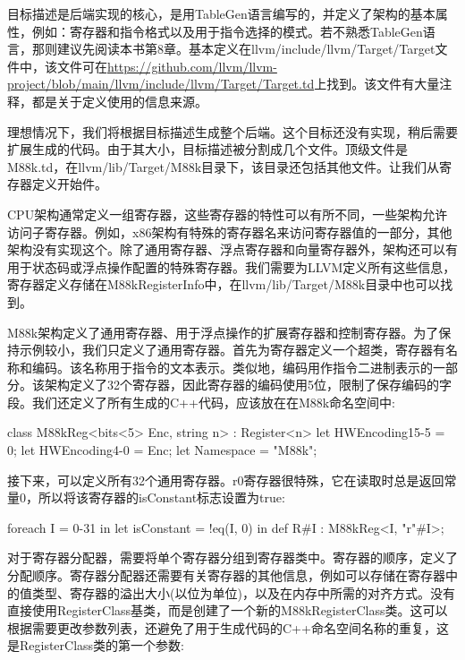 
目标描述是后端实现的核心，是用TableGen语言编写的，并定义了架构的基本属性，例如：寄存器和指令格式以及用于指令选择的模式。若不熟悉TableGen语言，那则建议先阅读本书第8章。基本定义在llvm/include/llvm/Target/Target文件中，该文件可在\url{https://github.com/llvm/llvm-project/blob/main/llvm/include/llvm/Target/Target.td}上找到。该文件有大量注释，都是关于定义使用的信息来源。

理想情况下，我们将根据目标描述生成整个后端。这个目标还没有实现，稍后需要扩展生成的代码。由于其大小，目标描述被分割成几个文件。顶级文件是M88k.td，在llvm/lib/Target/M88k目录下，该目录还包括其他文件。让我们从寄存器定义开始件。


CPU架构通常定义一组寄存器，这些寄存器的特性可以有所不同，一些架构允许访问子寄存器。例如，x86架构有特殊的寄存器名来访问寄存器值的一部分，其他架构没有实现这个。除了通用寄存器、浮点寄存器和向量寄存器外，架构还可以有用于状态码或浮点操作配置的特殊寄存器。我们需要为LLVM定义所有这些信息，寄存器定义存储在M88kRegisterInfo中，在llvm/lib/Target/M88k目录中也可以找到。

M88k架构定义了通用寄存器、用于浮点操作的扩展寄存器和控制寄存器。为了保持示例较小，我们只定义了通用寄存器。首先为寄存器定义一个超类，寄存器有名称和编码。该名称用于指令的文本表示。类似地，编码用作指令二进制表示的一部分。该架构定义了32个寄存器，因此寄存器的编码使用5位，限制了保存编码的字段。我们还定义了所有生成的C++代码，应该放在在M88k命名空间中:

\begin{cpp}
class M88kReg<bits<5> Enc, string n> : Register<n> {
    let HWEncoding{15-5} = 0;
    let HWEncoding{4-0} = Enc;
    let Namespace = "M88k";
}
\end{cpp}

接下来，可以定义所有32个通用寄存器。r0寄存器很特殊，它在读取时总是返回常量0，所以将该寄存器的isConstant标志设置为true:

\begin{cpp}
foreach I = 0-31 in {
    let isConstant = !eq(I, 0) in
        def R#I : M88kReg<I, "r"#I>;
}
\end{cpp}

对于寄存器分配器，需要将单个寄存器分组到寄存器类中。寄存器的顺序，定义了分配顺序。寄存器分配器还需要有关寄存器的其他信息，例如可以存储在寄存器中的值类型、寄存器的溢出大小(以位为单位)，以及在内存中所需的对齐方式。没有直接使用RegisterClass基类，而是创建了一个新的M88kRegisterClass类。这可以根据需要更改参数列表，还避免了用于生成代码的C++命名空间名称的重复，这是RegisterClass类的第一个参数:

